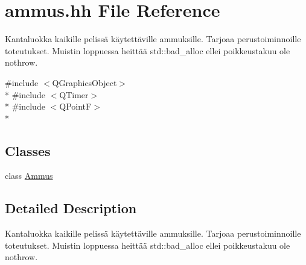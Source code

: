 \hypertarget{ammus_8hh}{\section{ammus.\-hh File Reference}
\label{ammus_8hh}
}


Kantaluokka kaikille pelissä käytettäville ammuksille. Tarjoaa perustoiminnoille toteutukset. Muistin loppuessa heittää std\-::bad\-\_\-alloc ellei poikkeustakuu ole nothrow.  


{\ttfamily \#include $<$Q\-Graphics\-Object$>$}\\*
{\ttfamily \#include $<$Q\-Timer$>$}\\*
{\ttfamily \#include $<$Q\-Point\-F$>$}\\*
\subsection*{Classes}
\begin{DoxyCompactItemize}
\item 
class \hyperlink{class_ammus}{Ammus}
\end{DoxyCompactItemize}


\subsection{Detailed Description}
Kantaluokka kaikille pelissä käytettäville ammuksille. Tarjoaa perustoiminnoille toteutukset. Muistin loppuessa heittää std\-::bad\-\_\-alloc ellei poikkeustakuu ole nothrow. 